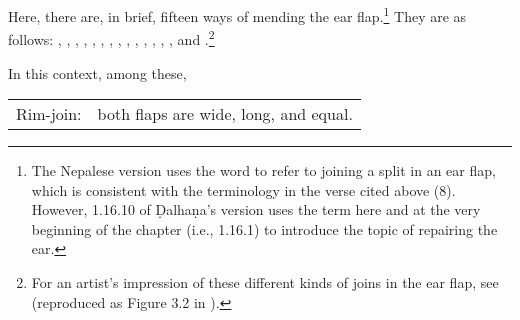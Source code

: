 \begin{translation}
Here, there are, in brief, fifteen ways of mending the ear flap.\footnote{The Nepalese version 
uses the word  to refer to joining a split in an ear flap, which is consistent 
with the terminology in the verse cited above (8). However, 1.16.10 of Ḍalhaṇa's version 
\citep[77]{vulgate} uses the term  here and at the very beginning of the 
chapter (i.e., 1.16.1) to introduce the topic of repairing the ear.}  They are as follows:
    , , 
    , , , 
    , , , 
    , , 
    , ,
    , , and .\footnote{For an artist's impression of these different kinds of joins in the ear flap, see \cite[290]{majn-1975} (reproduced as Figure 3.2 in \cite[154]{wuja-2003}).}
    
    In this context, among these, 
%        
%        
%        
%        
%        
%        
%        
%        
%        
%
\begin{longtable}{rp{}}
 Rim-join: & 
both flaps are wide, long, and equal.\\


\end{longtable}
\end{translation}
